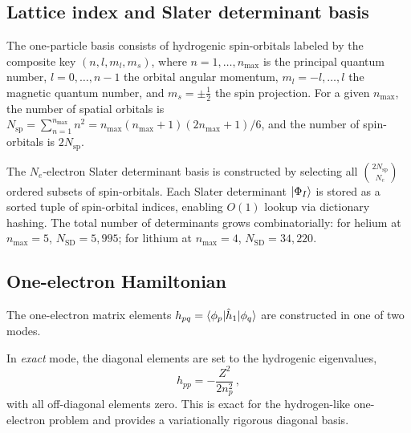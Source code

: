 \documentclass[aps,pra,twocolumn,superscriptaddress,longbibliography,floatfix]{revtex4-2}
\begin{document}
\subsection{Lattice index and Slater determinant basis}
\label{sec:lattice_index}

The one-particle basis consists of hydrogenic spin-orbitals labeled
by the composite key $(n, l, m_l, m_s)$, where $n = 1, \ldots, n_{\max}$
is the principal quantum number, $l = 0, \ldots, n-1$ the orbital
angular momentum, $m_l = -l, \ldots, l$ the magnetic quantum number,
and $m_s = \pm\tfrac{1}{2}$ the spin projection.
For a given $n_{\max}$, the number of spatial orbitals is
$N_{\text{sp}} = \sum_{n=1}^{n_{\max}} n^2 = n_{\max}(n_{\max}+1)(2n_{\max}+1)/6$,
and the number of spin-orbitals is $2N_{\text{sp}}$.

The $N_e$-electron Slater determinant basis is constructed by
selecting all $\binom{2N_{\text{sp}}}{N_e}$ ordered subsets of
spin-orbitals.
Each Slater determinant $\ket{\Phi_I}$ is stored as a sorted tuple
of spin-orbital indices, enabling $O(1)$ lookup via dictionary hashing.
The total number of determinants grows combinatorially:
for helium at $n_{\max}=5$, $N_{\text{SD}} = 5{,}995$;
for lithium at $n_{\max}=4$, $N_{\text{SD}} = 34{,}220$.

\subsection{One-electron Hamiltonian}
\label{sec:one_electron}

The one-electron matrix elements
$h_{pq} = \braket{\phi_p | \hat{h}_1 | \phi_q}$
are constructed in one of two modes.

In \emph{exact} mode, the diagonal elements are set to the
hydrogenic eigenvalues,
\begin{equation}
h_{pp} = -\frac{Z^2}{2n_p^2}\,,
\label{eq:h1_exact}
\end{equation}
with all off-diagonal elements zero.
This is exact for the hydrogen-like one-electron problem and provides
a variationally rigorous diagonal basis.
\end{document}
